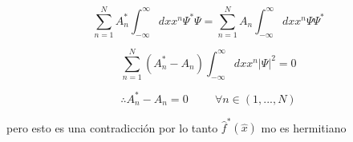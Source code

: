 \documentclass[12pt,a4paper]{article}
\begin{document}
\begin{enumerate}
    \begin{equation*}
        \sum_{n=1}^{N} A_n^*\int_{-\infty}^{\infty}dx   x^{n} \Psi^* \Psi = \sum_{n=1}^{N}A_n \int_{-\infty}^{\infty}dx   x^n \Psi \Psi^*
    \end{equation*}
    
    \begin{equation*}
        \sum_{n=1}^{N} (A_n^* - A_n) \int_{-\infty}^{\infty}dx   x^{n} |\Psi|^2 = 0
    \end{equation*}
    
    \begin{equation*}
        \therefore  A_n^* - A_n = 0 \hspace{1cm} \forall n \in (1, ... , N)
    \end{equation*}
    
    pero esto es una contradicción por lo tanto $\hat{f}^*(\hat{x})$ mo es hermitiano
    
    
    
\end{enumerate}
\end{document}
